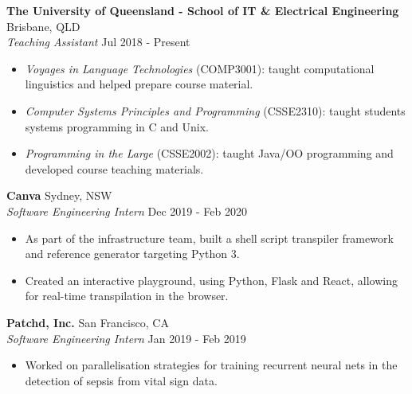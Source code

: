 \documentclass[a4paper]{article}
\newenvironment{myitemize}
{   \small
    \vspace{-2pt}
    \begin{itemize}
    \setlength{\itemsep}{0pt}
    \setlength{\parskip}{0pt}
    \setlength{\parsep}{0pt}     }
{ \end{itemize}                  }
\begin{document}
\textbf{The University of Queensland - School of IT \& Electrical Engineering} \hfill Brisbane, QLD\\
\textit{Teaching Assistant} \hfill Jul 2018 - Present\\
\vspace{-0.5mm}
\begin{myitemize} \itemsep 0.5mm
	\item \textit{Voyages in Language Technologies} (COMP3001): taught computational linguistics and helped prepare course material.
	\item \textit{Computer Systems Principles and Programming} (CSSE2310): taught students systems programming in C and Unix.
	\item \textit{Programming in the Large} (CSSE2002): taught Java/OO programming and developed course teaching materials.
\end{myitemize}


\textbf{Canva} \hfill Sydney, NSW\\
\textit{Software Engineering Intern} \hfill Dec 2019 - Feb 2020\\
\begin{myitemize} \itemsep 0.5mm
	\item As part of the infrastructure team, built a shell script transpiler framework and reference generator targeting Python 3.
	\item Created an interactive playground, using Python, Flask and React, allowing for real-time transpilation in the browser.
\end{myitemize}

\textbf{Patchd, Inc.} \hfill San Francisco, CA\\
\textit{Software Engineering Intern} \hfill  Jan 2019 - Feb 2019\\
\begin{myitemize} \itemsep 0.5mm
	\item Worked on parallelisation strategies for training recurrent neural nets in the detection of sepsis from vital sign data.
\end{myitemize}
\end{document}
